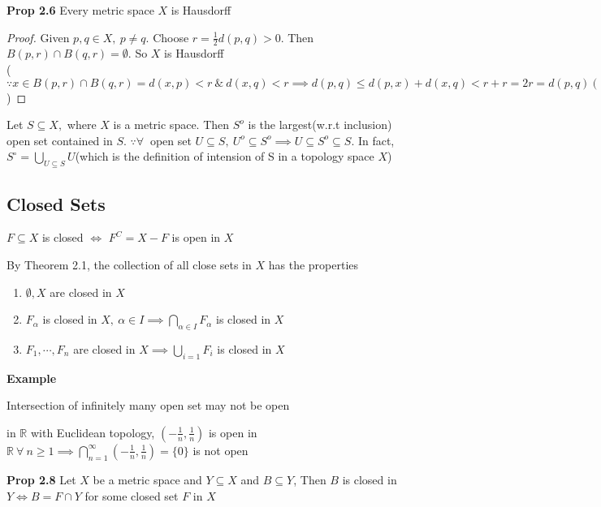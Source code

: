 \textbf{Prop 2.6} Every metric space $X$ is Hausdorff

\begin{proof}
	Given $p,q \in X,~p\neq q$. Choose $r = \frac{1}{2}d(p,q)>0$. Then $B(p,r)\cap B(q,r) = \emptyset$. So $X$ is Hausdorff \\($\because x \in B(p,r) \cap B(q,r) = d(x,p) < r ~\&~ d(x,q) < r \implies d(p,q) \leq d(p,x) + d(x,q) < r+r = 2r = d(p,q) (\rightarrow\leftarrow)$ )
\end{proof} 

\begin{rmk*}
	Let $S \subseteq X,$ where $X$ is a metric space. Then $S^o$ is the largest(w.r.t inclusion) open set contained in $S$. $\because \forall~$ open set $U \subseteq S,~U^o\subseteq S^o \implies U \subseteq S^o \subseteq S$. In fact, $S^\circ = \bigcup_{U \subseteq S}U$(which is the definition of intension of S in a topology space $X$)
\end{rmk*}


\newpage


\subsection{Closed Sets}

\begin{defn}
	$F \subseteq X$ is closed $\Leftrightarrow$ $F^C = X-F$ is open in $X$
\end{defn}

By Theorem 2.1, the collection of all close sets in $X$ has the properties

\begin{enumerate}[wide,label = \textbf{(\roman*)}]
	\item $\emptyset,X$ are closed in $X$
	\item $F_{\alpha}$ is closed in $X,~\alpha \in I \implies \bigcap_{\alpha \in I}F_{\alpha}$ is closed in $X$
	\item $F_1,\cdots,F_n$ are closed in $X \implies \bigcup_{i=1}F_i$ is closed in $X$
\end{enumerate}

\textbf{Example}

Intersection of infinitely many open set may not be open
	
in $\mathbb R$ with Euclidean topology, $(-\frac{1}{n},\frac{1}{n})$ is open in $\mathbb R ~\forall~n \geq 1 \implies \bigcap_{n=1}^{\infty}(-\frac{1}{n},\frac{1}{n}) = \{0\}$ is not open

\textbf{Prop 2.8} Let $X$ be a metric space and $Y \subseteq X$ and $B \subseteq Y$, Then $B$ is closed in $Y \Leftrightarrow B = F \cap Y$ for some closed set $F$ in $X$

